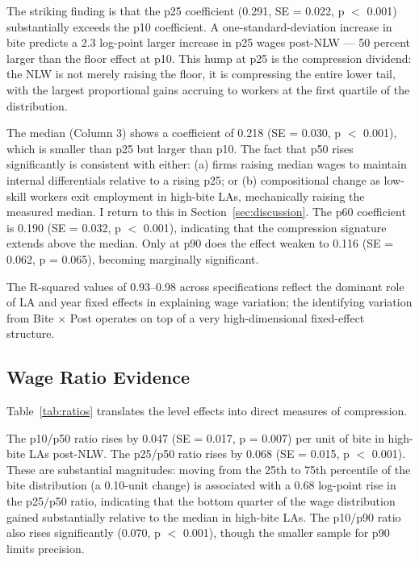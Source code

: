 \documentclass[12pt]{article}
\begin{document}
The striking finding is that the p25 coefficient (0.291, SE = 0.022, p $<$ 0.001) substantially exceeds the p10 coefficient. A one-standard-deviation increase in bite predicts a 2.3 log-point larger increase in p25 wages post-NLW --- 50 percent larger than the floor effect at p10. This hump at p25 is the compression dividend: the NLW is not merely raising the floor, it is compressing the entire lower tail, with the largest proportional gains accruing to workers at the first quartile of the distribution.

The median (Column 3) shows a coefficient of 0.218 (SE = 0.030, p $<$ 0.001), which is smaller than p25 but larger than p10. The fact that p50 rises significantly is consistent with either: (a) firms raising median wages to maintain internal differentials relative to a rising p25; or (b) compositional change as low-skill workers exit employment in high-bite LAs, mechanically raising the measured median. I return to this in Section~\ref{sec:discussion}. The p60 coefficient is 0.190 (SE = 0.032, p $<$ 0.001), indicating that the compression signature extends above the median. Only at p90 does the effect weaken to 0.116 (SE = 0.062, p = 0.065), becoming marginally significant.

The R-squared values of 0.93--0.98 across specifications reflect the dominant role of LA and year fixed effects in explaining wage variation; the identifying variation from Bite $\times$ Post operates on top of a very high-dimensional fixed-effect structure.

\subsection{Wage Ratio Evidence}

Table~\ref{tab:ratios} translates the level effects into direct measures of compression.



The p10/p50 ratio rises by 0.047 (SE = 0.017, p = 0.007) per unit of bite in high-bite LAs post-NLW. The p25/p50 ratio rises by 0.068 (SE = 0.015, p $<$ 0.001). These are substantial magnitudes: moving from the 25th to 75th percentile of the bite distribution (a 0.10-unit change) is associated with a 0.68 log-point rise in the p25/p50 ratio, indicating that the bottom quarter of the wage distribution gained substantially relative to the median in high-bite LAs. The p10/p90 ratio also rises significantly (0.070, p $<$ 0.001), though the smaller sample for p90 limits precision.
\end{document}
